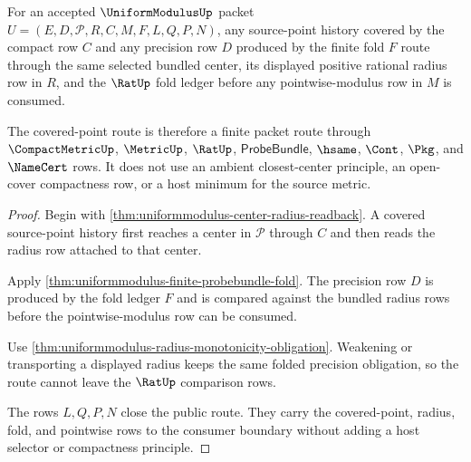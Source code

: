 \begin{theorem}
\label{thm:uniformmodulus-covered-point-radius-route}
For an accepted $\UniformModulusUp$ packet $U=(E,D,\mathcal{P},R,C,M,F,L,Q,P,N)$, any source-point history covered by the compact row $C$ and any precision row $D$ produced by the finite fold $F$ route through the same selected bundled center, its displayed positive rational radius row in $R$, and the $\RatUp$ fold ledger before any pointwise-modulus row in $M$ is consumed.

The covered-point route is therefore a finite packet route through $\CompactMetricUp$, $\MetricUp$, $\RatUp$, $\mathsf{ProbeBundle}$, $\hsame$, $\Cont$, $\Pkg$, and $\NameCert$ rows. It does not use an ambient closest-center principle, an open-cover compactness row, or a host minimum for the source metric.
\end{theorem}
\begin{proof}
Begin with \autoref{thm:uniformmodulus-center-radius-readback}. A covered source-point history first reaches a center in $\mathcal{P}$ through $C$ and then reads the radius row attached to that center.

Apply \autoref{thm:uniformmodulus-finite-probebundle-fold}. The precision row $D$ is produced by the fold ledger $F$ and is compared against the bundled radius rows before the pointwise-modulus row can be consumed.

Use \autoref{thm:uniformmodulus-radius-monotonicity-obligation}. Weakening or transporting a displayed radius keeps the same folded precision obligation, so the route cannot leave the $\RatUp$ comparison rows.

The rows $L,Q,P,N$ close the public route. They carry the covered-point, radius, fold, and pointwise rows to the consumer boundary without adding a host selector or compactness principle.
\end{proof}

